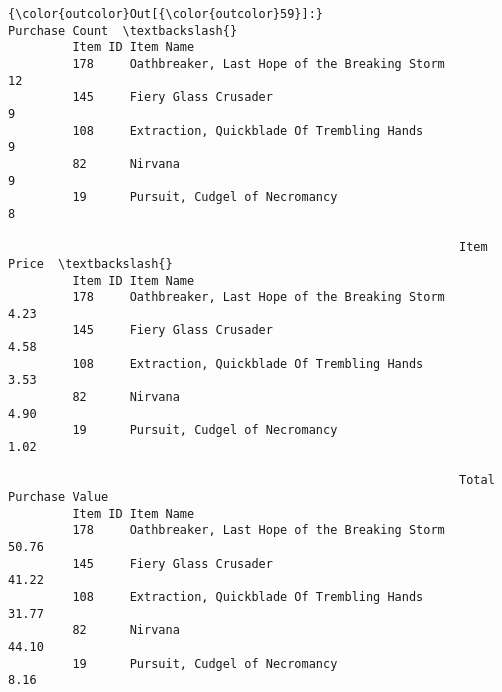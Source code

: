 \documentclass[11pt]{article}
\begin{document}
\begin{Verbatim}[commandchars=\\\{\}]
{\color{outcolor}Out[{\color{outcolor}59}]:}                                                       Purchase Count  \textbackslash{}
         Item ID Item Name                                                      
         178     Oathbreaker, Last Hope of the Breaking Storm              12   
         145     Fiery Glass Crusader                                       9   
         108     Extraction, Quickblade Of Trembling Hands                  9   
         82      Nirvana                                                    9   
         19      Pursuit, Cudgel of Necromancy                              8   
         
                                                               Item Price  \textbackslash{}
         Item ID Item Name                                                  
         178     Oathbreaker, Last Hope of the Breaking Storm        4.23   
         145     Fiery Glass Crusader                                4.58   
         108     Extraction, Quickblade Of Trembling Hands           3.53   
         82      Nirvana                                             4.90   
         19      Pursuit, Cudgel of Necromancy                       1.02   
         
                                                               Total Purchase Value  
         Item ID Item Name                                                           
         178     Oathbreaker, Last Hope of the Breaking Storm                 50.76  
         145     Fiery Glass Crusader                                         41.22  
         108     Extraction, Quickblade Of Trembling Hands                    31.77  
         82      Nirvana                                                      44.10  
         19      Pursuit, Cudgel of Necromancy                                 8.16  
\end{Verbatim}
            
\end{document}
